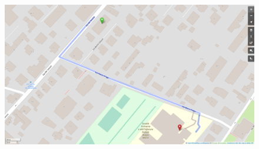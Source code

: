 \documentclass[10pt, aspectratio=169, compress, protectframetitle, handout]{beamer}
\begin{document}
\begin{frame}{}

    \vspace*{-10pt}
    \begin{figure}
        \centering
        \hspace*{-13pt}
        \includegraphics[scale=0.36]{figures/Distanza 7998556-7998442 v2}
    \end{figure}
    
\end{frame}
\end{document}

